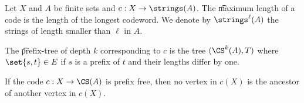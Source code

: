 


Let $X$ and $A$ be finite sets and $c: X \to \strings(A)$.
The \t{maximum length} of a code is the length of the longest codeword.
We denote by $\strings^\ell(A)$ the strings of length smaller than $\ell$ in $A$.

The \t{prefix-tree} of depth $k$ corresponding to $c$ is the tree $(\CS^k(A),T)$ where $\set{s, t} \in E$ if $s$ is a prefix of $t$ and their lengths differ by one.

\begin{proposition}
If the code $c: X \to \CS(A)$ is prefix free, then no vertex in $c(X)$ is the ancestor of another vertex in $c(X)$.
\end{proposition}

\blankpage
